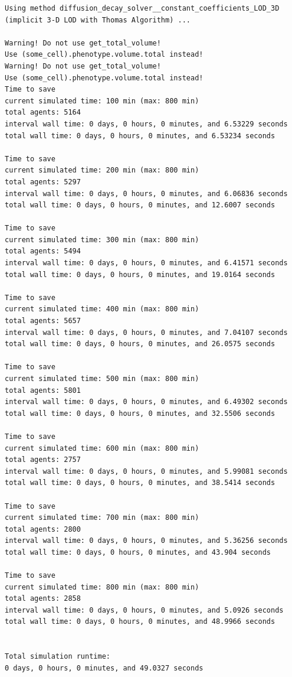\documentclass[12pt]{article}
\begin{document}
\begin{scriptsize}
\begin{verbatim}
Using method diffusion_decay_solver__constant_coefficients_LOD_3D (implicit 3-D LOD with Thomas Algorithm) ... 

Warning! Do not use get_total_volume!
Use (some_cell).phenotype.volume.total instead!
Warning! Do not use get_total_volume!
Use (some_cell).phenotype.volume.total instead!
Time to save
current simulated time: 100 min (max: 800 min)
total agents: 5164
interval wall time: 0 days, 0 hours, 0 minutes, and 6.53229 seconds 
total wall time: 0 days, 0 hours, 0 minutes, and 6.53234 seconds 

Time to save
current simulated time: 200 min (max: 800 min)
total agents: 5297
interval wall time: 0 days, 0 hours, 0 minutes, and 6.06836 seconds 
total wall time: 0 days, 0 hours, 0 minutes, and 12.6007 seconds 

Time to save
current simulated time: 300 min (max: 800 min)
total agents: 5494
interval wall time: 0 days, 0 hours, 0 minutes, and 6.41571 seconds 
total wall time: 0 days, 0 hours, 0 minutes, and 19.0164 seconds 

Time to save
current simulated time: 400 min (max: 800 min)
total agents: 5657
interval wall time: 0 days, 0 hours, 0 minutes, and 7.04107 seconds 
total wall time: 0 days, 0 hours, 0 minutes, and 26.0575 seconds 

Time to save
current simulated time: 500 min (max: 800 min)
total agents: 5801
interval wall time: 0 days, 0 hours, 0 minutes, and 6.49302 seconds 
total wall time: 0 days, 0 hours, 0 minutes, and 32.5506 seconds 

Time to save
current simulated time: 600 min (max: 800 min)
total agents: 2757
interval wall time: 0 days, 0 hours, 0 minutes, and 5.99081 seconds 
total wall time: 0 days, 0 hours, 0 minutes, and 38.5414 seconds 

Time to save
current simulated time: 700 min (max: 800 min)
total agents: 2800
interval wall time: 0 days, 0 hours, 0 minutes, and 5.36256 seconds 
total wall time: 0 days, 0 hours, 0 minutes, and 43.904 seconds 

Time to save
current simulated time: 800 min (max: 800 min)
total agents: 2858
interval wall time: 0 days, 0 hours, 0 minutes, and 5.0926 seconds 
total wall time: 0 days, 0 hours, 0 minutes, and 48.9966 seconds 


Total simulation runtime: 
0 days, 0 hours, 0 minutes, and 49.0327 seconds    
\end{verbatim}
\end{scriptsize}
\end{document}
